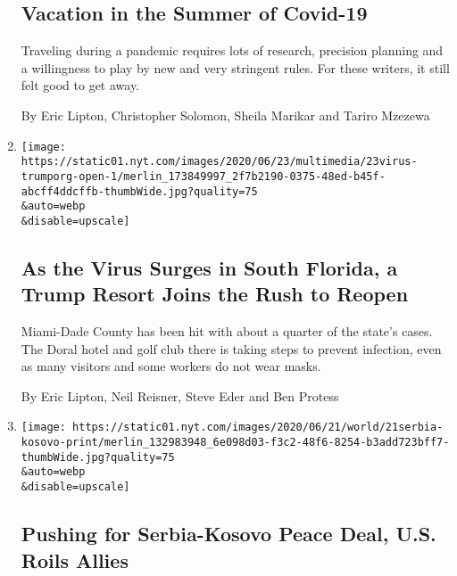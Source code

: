 \begin{enumerate}
  \hypertarget{vacation-in-the-summer-of-covid-19}{%
  \subsection{Vacation in the Summer of
  Covid-19}\label{vacation-in-the-summer-of-covid-19}}

  Traveling during a pandemic requires lots of research, precision
  planning and a willingness to play by new and very stringent rules.
  For these writers, it still felt good to get away.

  By Eric Lipton, Christopher Solomon, Sheila Marikar and Tariro Mzezewa
\item
  \href{/2020/06/23/us/trump-doral-reopen-coronavirus.html}{}

  \texttt{[image: https://static01.nyt.com/images/2020/06/23/multimedia/23virus-trumporg-open-1/merlin\_173849997\_2f7b2190-0375-48ed-b45f-abcff4ddcffb-thumbWide.jpg?quality=75\\\&auto=webp\\\&disable=upscale]}

  \hypertarget{as-the-virus-surges-in-south-florida-a-trump-resort-joins-the-rush-to-reopen}{%
  \subsection{As the Virus Surges in South Florida, a Trump Resort Joins
  the Rush to
  Reopen}\label{as-the-virus-surges-in-south-florida-a-trump-resort-joins-the-rush-to-reopen}}

  Miami-Dade County has been hit with about a quarter of the state's
  cases. The Doral hotel and golf club there is taking steps to prevent
  infection, even as many visitors and some workers do not wear masks.

  By Eric Lipton, Neil Reisner, Steve Eder and Ben Protess
\item
  \href{/2020/06/20/world/europe/serbia-kosovo-peace-elections.html}{}

  \texttt{[image: https://static01.nyt.com/images/2020/06/21/world/21serbia-kosovo-print/merlin\_132983948\_6e098d03-f3c2-48f6-8254-b3add723bff7-thumbWide.jpg?quality=75\\\&auto=webp\\\&disable=upscale]}

  \hypertarget{pushing-for-serbia-kosovo-peace-deal-us-roils-allies}{%
  \subsection{Pushing for Serbia-Kosovo Peace Deal, U.S. Roils
  Allies}\label{pushing-for-serbia-kosovo-peace-deal-us-roils-allies}}


\end{enumerate}
